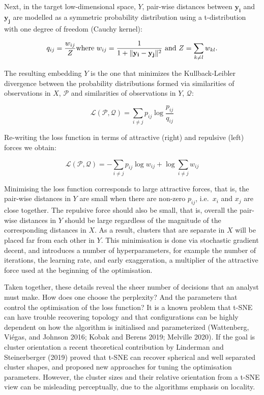 \documentclass[article,notitle]{jdssv}
\begin{document}
Next, in the target low-dimensional space, \(Y\), pair-wise distances between
\(\mathbf{y_i}\) and \(\mathbf{y_j}\) are modelled as a symmetric probability
distribution using a t-distribution with one degree of freedom (Cauchy kernel):

\[ q_{ij} = \frac{w_{ij}}{Z} \\ \text{where } w_{ij} = \frac{1}{ 1 + \lVert
\mathbf{y_i - y_j} \rVert ^ 2} \text{ and } Z = \sum_{k \ne l} w_{kl}. \]

The resulting embedding \(Y\) is the one that minimizes the Kullback-Leibler
divergence between the probability distributions formed via similarities of
observations in \(X\), \(\mathcal{P}\) and similarities of observations in \(Y\),
\(\mathcal{Q}\):

\[ \mathcal{L(\mathcal{P}, \mathcal{Q})} = \sum_{i \ne j} p_{ij} \log
\frac{p_{ij}}{q_{ij}}\]

Re-writing the loss function in terms of attractive (right) and repulsive
(left) forces we obtain:

\[ \mathcal{L(\mathcal{P}, \mathcal{Q})} = -\sum_{i \ne j} p_{ij}\log w_{ij} +
\log\sum_{i \ne j} w_{ij} \]

Minimising the loss function corresponds to large attractive
forces, that is, the pair-wise distances in \(Y\) are small when there are
non-zero \(p_{ij}\), i.e.~\(x_i\) and \(x_j\) are close together. The repulsive force
should also be small, that is, overall the
pair-wise distances in \(Y\) should be large regardless of the magnitude of the
corresponding distances in \(X\). As a result, clusters that are separate in \(X\)
will be placed far from each other in \(Y\).
This minimisation is done via stochastic gradient decent,
and introduces a number of hyperparameters, for example the number of iterations,
the learning rate, and early exaggeration, a multiplier of the attractive force
used at the beginning of the optimisation.

Taken together, these details reveal the sheer number of decisions that an
analyst must make. How does one choose the perplexity? And the
parameters that control the optimisation of the loss function?
It is a known problem that
t-SNE can have trouble recovering topology and that configurations can be
highly dependent on how the algorithm is initialised and parameterized
(Wattenberg, Viégas, and Johnson 2016; Kobak and Berens 2019; Melville 2020). If the goal is cluster
orientation a recent theoretical contribution by Linderman and Steinerberger (2019) proved that
t-SNE can recover spherical and well separated cluster shapes, and proposed new
approaches for tuning the optimisation parameters. However, the cluster sizes
and their relative orientation from a t-SNE view can be misleading
perceptually, due to the algorithms emphasis on locality.
\end{document}
